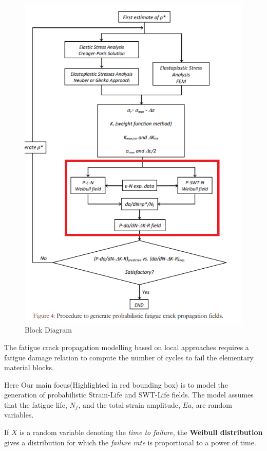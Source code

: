 \documentclass[11pt]{article}
\begin{document}
\begin{figure}
\centering
\includegraphics{BlockDiagram.png}
\caption{Block Diagram}
\end{figure}

The fatigue crack propagation modelling based on local approaches
requires a fatigue damage relation to compute the number of cycles to
fail the elementary material blocks.

Here Our main focus(Highlighted in red bounding box) is to model the
generation of probabilistic Strain-Life and SWT-Life fields. The model
assumes that the fatigue life, \(N_f\), and the total strain amplitude,
\(Ea\), are random variables.

If \(X\) is a random variable denoting the \emph{time to failure}, the
\textbf{Weibull distribution} gives a distribution for which the
\emph{failure rate} is proportional to a power of time.
\end{document}
